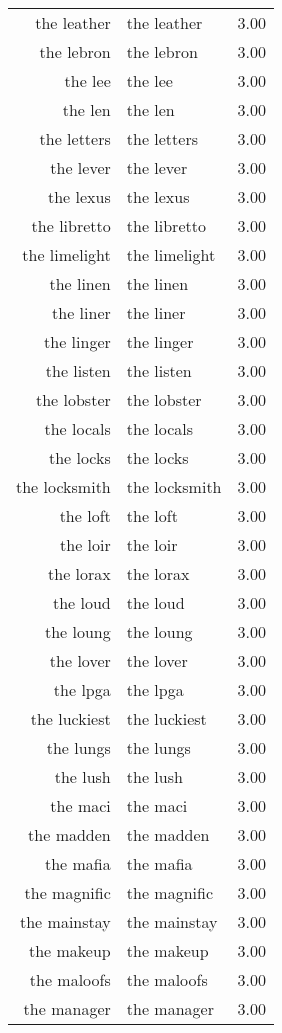\begin{table}[ht]
\begin{tabular}{rlr}
  the leather & the leather & 3.00 \\ 
  the lebron & the lebron & 3.00 \\ 
  the lee & the lee & 3.00 \\ 
  the len & the len & 3.00 \\ 
  the letters & the letters & 3.00 \\ 
  the lever & the lever & 3.00 \\ 
  the lexus & the lexus & 3.00 \\ 
  the libretto & the libretto & 3.00 \\ 
  the limelight & the limelight & 3.00 \\ 
  the linen & the linen & 3.00 \\ 
  the liner & the liner & 3.00 \\ 
  the linger & the linger & 3.00 \\ 
  the listen & the listen & 3.00 \\ 
  the lobster & the lobster & 3.00 \\ 
  the locals & the locals & 3.00 \\ 
  the locks & the locks & 3.00 \\ 
  the locksmith & the locksmith & 3.00 \\ 
  the loft & the loft & 3.00 \\ 
  the loir & the loir & 3.00 \\ 
  the lorax & the lorax & 3.00 \\ 
  the loud & the loud & 3.00 \\ 
  the loung & the loung & 3.00 \\ 
  the lover & the lover & 3.00 \\ 
  the lpga & the lpga & 3.00 \\ 
  the luckiest & the luckiest & 3.00 \\ 
  the lungs & the lungs & 3.00 \\ 
  the lush & the lush & 3.00 \\ 
  the maci & the maci & 3.00 \\ 
  the madden & the madden & 3.00 \\ 
  the mafia & the mafia & 3.00 \\ 
  the magnific & the magnific & 3.00 \\ 
  the mainstay & the mainstay & 3.00 \\ 
  the makeup & the makeup & 3.00 \\ 
  the maloofs & the maloofs & 3.00 \\ 
  the manager & the manager & 3.00 \\ 

\end{tabular}
\end{table}
